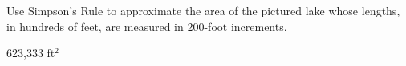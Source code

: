 {Use Simpson's Rule to approximate the area of the pictured lake whose lengths, in hundreds of feet, are measured in 200-foot increments.\label{07_01_ex_30_1}

\begin{center}\end{center}}
{623,333 ft$^2$}
